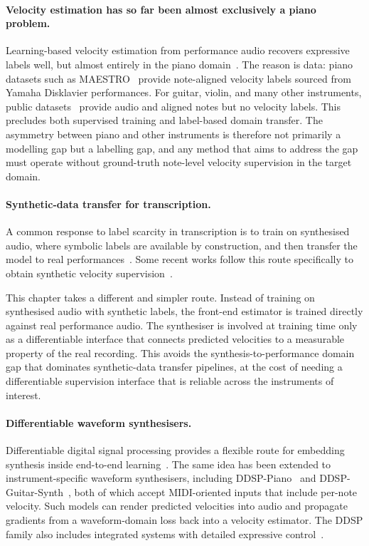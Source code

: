\paragraph{Velocity estimation has so far been almost exclusively a piano problem.}
Learning-based velocity estimation from performance audio recovers expressive labels well, but almost entirely in the piano domain~\cite{jeong2018timbre, simonetta2022acoustics, kim2024method}. The reason is data: piano datasets such as MAESTRO~\cite{hawthorne2019maestro} provide note-aligned velocity labels sourced from Yamaha Disklavier performances. For guitar, violin, and many other instruments, public datasets~\cite{tamer2023violin, riley2024gaps, riley2024high} provide audio and aligned notes but no velocity labels. This precludes both supervised training and label-based domain transfer. The asymmetry between piano and other instruments is therefore not primarily a modelling gap but a labelling gap, and any method that aims to address the gap must operate without ground-truth note-level velocity supervision in the target domain.

\paragraph{Synthetic-data transfer for transcription.}
A common response to label scarcity in transcription is to train on synthesised audio, where symbolic labels are available by construction, and then transfer the model to real performances~\cite{maman2022general, zang2024synthtab, kusaka2025learn}. Some recent works follow this route specifically to obtain synthetic velocity supervision~\cite{sato2024annotationfree, wang2026vioptt}.

This chapter takes a different and simpler route. Instead of training on synthesised audio with synthetic labels, the front-end estimator is trained directly against real performance audio. The synthesiser is involved at training time only as a differentiable interface that connects predicted velocities to a measurable property of the real recording. This avoids the synthesis-to-performance domain gap that dominates synthetic-data transfer pipelines, at the cost of needing a differentiable supervision interface that is reliable across the instruments of interest.

\paragraph{Differentiable waveform synthesisers.}
Differentiable digital signal processing provides a flexible route for embedding synthesis inside end-to-end learning~\cite{engel2020ddsp}. The same idea has been extended to instrument-specific waveform synthesisers, including DDSP-Piano~\cite{renault2023ddsp_piano} and DDSP-Guitar-Synth~\cite{jonason2024guitar}, both of which accept MIDI-oriented inputs that include per-note velocity. Such models can render predicted velocities into audio and propagate gradients from a waveform-domain loss back into a velocity estimator. The DDSP family also includes integrated systems with detailed expressive control~\cite{wu2022mididdsp}.

